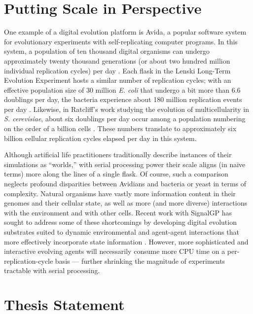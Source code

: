 \section{Putting Scale in Perspective}

One example of a digital evolution platform is Avida, a popular software system for evolutionary experiments with self-replicating computer programs.
In this system, a population of ten thousand digital organisms can undergo approximately twenty thousand generations (or about two hundred million individual replication cycles) per day \citep{ofria2009artificial}.
Each flask in the Lenski Long-Term Evolution Experiment hosts a similar number of replication cycles; with an effective population size of 30 million \textit{E. coli} that undergo a bit more than 6.6 doublings per day, the bacteria experience about 180 million replication events per day \citep{good2017dynamics}.
Likewise, in Ratcliff’s work studying the evolution of multicellularity in \textit{S. cerevisiae}, about six doublings per day occur among a population numbering on the order of a billion cells \citep{ratcliff2012experimental}.
These numbers translate to approximately six billion cellular replication cycles elapsed per day in this system.

Although artificial life practitioners traditionally describe instances of their simulations as ``worlds,'' with serial processing power their scale aligns (in naive terms) more along the lines of a single flask.
Of course, such a comparison neglects profound disparities between Avidians and bacteria or yeast in terms of complexity.
Natural organisms have vastly more information content in their genomes and their cellular state, as well as more (and more diverse) interactions with the environment and with other cells.
Recent work with SignalGP has sought to address some of these shortcomings by developing digital evolution substrates suited to dynamic environmental and agent-agent interactions \citep{lalejini2018evolving} that more effectively incorporate state information \citep{lalejini2021tag,lalejini2020case, moreno2019evaluating}.
However, more sophisticated and interactive evolving agents will necessarily consume more CPU time on a per-replication-cycle basis --- further shrinking the magnitude of experiments tractable with serial processing.

\section{Thesis Statement}

